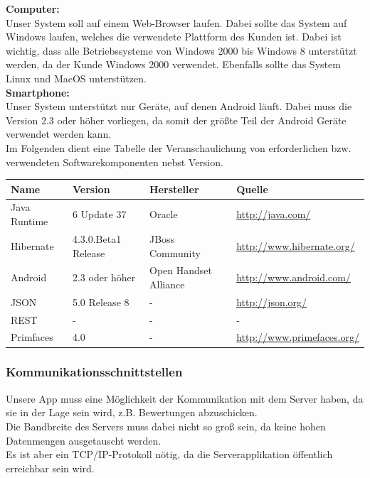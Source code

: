 \documentclass[fontsize=12pt,paper=a4,twoside]{scrartcl}
\begin{document}
   \textbf{Computer:}\\
  Unser System soll auf einem Web-Browser laufen. Dabei sollte das System auf Windows laufen, welches 
  die verwendete Plattform des Kunden ist. Dabei ist wichtig, dass alle Betriebssysteme von Windows 
  2000 bis Windows 8 unterstützt werden, da der Kunde Windows 2000 verwendet. Ebenfalls sollte das 
  System Linux und MacOS unterstützen. \\
  
  \textbf{Smartphone:}\\
  Unser System unterstützt nur Geräte, auf denen Android läuft. Dabei muss  die Version 2.3 oder höher 
  vorliegen, da somit der größte Teil der Android Geräte verwendet werden kann.\\
Im Folgenden dient eine Tabelle der Veranschaulichung von erforderlichen bzw. verwendeten Softwarekomponenten nebst 
Version.  \\ 

\label{Tabelle}
  \begin{tabular}{|l|l|l|l|}\hline
    \textbf{Name} & \textbf{Version} & \textbf{Hersteller} & \textbf{Quelle} \\\hline
    Java Runtime & 6 Update 37 & Oracle & \url{http://java.com/} \\\hline
    Hibernate & 4.3.0.Beta1 Release& JBoss Community &  
   \url{http://www.hibernate.org/}\\\hline
    Android & 2.3 oder höher & Open Handset Alliance & \url{http://www.android.com/} \\\hline
    JSON & 5.0 Release 8 & - & \url{http://json.org/} \\\hline
    REST & - & - & - \\\hline
    Primfaces & 4.0 & - & \url{http://www.primefaces.org/} \\\hline
  \end{tabular}
  

\subsubsection{Kommunikationsschnittstellen}
Unsere App muss eine Möglichkeit der Kommunikation mit dem Server haben, da sie in der Lage sein wird, z.B. Bewertungen abzuschicken. \\
Die Bandbreite des Servers muss dabei nicht so groß sein, da keine hohen Datenmengen ausgetauscht werden. \\ 
Es ist aber ein TCP/IP-Protokoll nötig, da die Serverapplikation öffentlich erreichbar sein wird.
\end{document}
